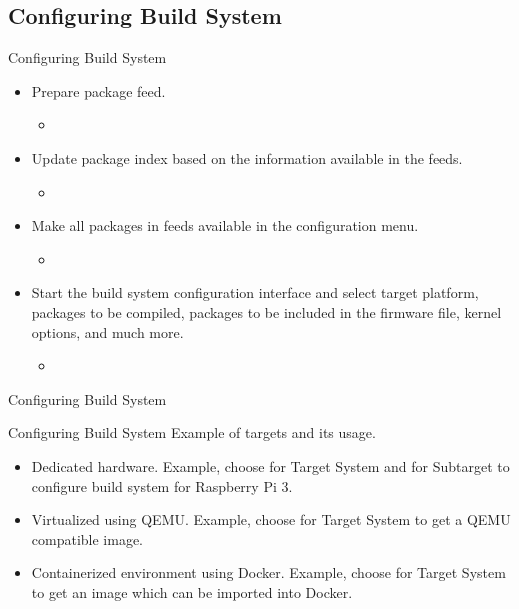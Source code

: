 \subsection{Configuring Build System}
\begin{frame}{Configuring Build System}
    \pause
    \begin{itemize}[<+-|alert@+>]
        \item Prepare package feed.
        \begin{itemize}
            \item {}
        \end{itemize}
        \item Update package index based on the information available in the feeds.
        \begin{itemize}
            \item {}
        \end{itemize}
        \item Make all packages in feeds available in the configuration menu.
        \begin{itemize}
            \item {}
        \end{itemize}
        \item Start the build system configuration interface and select target platform, packages to be compiled, packages to be included in the firmware file, kernel options, and much more.
        \begin{itemize}
            \item {}
        \end{itemize}
    \end{itemize}
\end{frame}

\begin{frame}{Configuring Build System}
\end{frame}

\begin{frame}{Configuring Build System}
    Example of targets and its usage.
    \pause
    \begin{itemize}[<+-|alert@+>]
        \item Dedicated hardware. Example, choose  for Target System and  for Subtarget to configure build system for Raspberry Pi 3.
        \item Virtualized using QEMU. Example, choose  for Target System to get a QEMU compatible image.
        \item Containerized environment using Docker. Example, choose  for Target System to get an image which can be imported into Docker.
    \end{itemize}
\end{frame}

